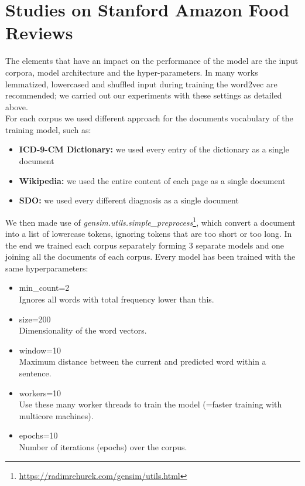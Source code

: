 \section{Studies on Stanford Amazon Food Reviews}


The elements that have an impact on the performance of the model are the input corpora, model architecture and the hyper-parameters.
In many works lemmatized, lowercased and shuffled input during training the word2vec are recommended; we carried out our experiments with these settings as detailed above.\\
For each corpus we used different approach for the documents vocabulary of the training model, such as:
\begin{itemize}
	\item \textbf{ICD-9-CM Dictionary:} we used every entry of the dictionary as a single document
	\item \textbf{Wikipedia:} we used the entire content of each page as a single document
	\item \textbf{SDO:} we used every different diagnosis as a single document
\end{itemize}

We then made use of \textit{gensim.utils.simple\_preprocess}\footnote{\url{https://radimrehurek.com/gensim/utils.html}}, which convert a document into a list of lowercase tokens, ignoring tokens that are too short or too long.
In the end we trained each corpus separately forming 3 separate models and one joining all the documents of each corpus. Every model has been trained with the same hyperparameters:
\begin{itemize}
	\item min\_count=2 \\
	Ignores all words with total frequency lower than this.
	\item size=200 \\
	Dimensionality of the word vectors.
	\item window=10\\
	Maximum distance between the current and predicted word within a sentence.
	\item workers=10 \\
	Use these many worker threads to train the model (=faster training with multicore machines).
	\item epochs=10 \\
	Number of iterations (epochs) over the corpus.
\end{itemize}

